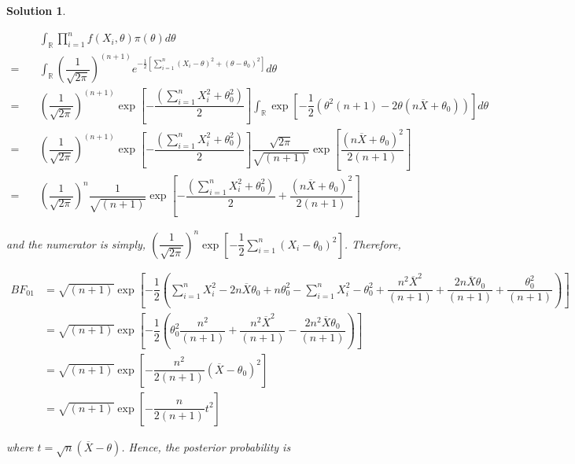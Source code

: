 \documentclass[12pt]{article}
\theoremstyle{problemstyle}
\newtheorem*{solution*}{Solution}
\newcommand{\R}{\mathbb{R}}
\begin{document}
\begin{solution*}
\begin{enumerate}
        \begingroup
        \allowdisplaybreaks
        \begin{align*}
            & \int_{\R} \prod_{i = 1}^n f(X_i, \theta) \pi(\theta) d\theta \\
            = \quad & \int_{\R} \left( \dfrac{1}{\sqrt{2\pi}} \right)^{(n+1)} e^{-\frac{1}{2}\left[ \sum_{i=1}^n (X_i - \theta)^2 + (\theta - \theta_0)^2 \right]} d\theta\\
            = \quad & \left( \dfrac{1}{\sqrt{2\pi}} \right)^{(n+1)} \exp\left[ -\dfrac{\left(\sum_{i=1}^n X_i^2 + \theta_0^2\right)}{2} \right] \int_{\R} \exp\left[ -\dfrac{1}{2}\left(  \theta^2 (n+1) - 2\theta(n\overline{X} + \theta_0) \right) \right]d\theta\\
            = \quad & \left( \dfrac{1}{\sqrt{2\pi}} \right)^{(n+1)} \exp\left[ -\dfrac{\left(\sum_{i=1}^n X_i^2 + \theta_0^2\right)}{2} \right] \dfrac{\sqrt{2\pi}}{\sqrt{(n+1)}} \exp\left[ \dfrac{(n\overline{X} + \theta_0)^2}{2(n+1)} \right]\\
            = \quad & \left( \dfrac{1}{\sqrt{2\pi}} \right)^{n} \dfrac{1}{\sqrt{(n+1)}} \exp\left[ -\dfrac{\left(\sum_{i=1}^n X_i^2 + \theta_0^2\right)}{2} + \dfrac{(n\overline{X} + \theta_0)^2}{2(n+1)} \right]
        \end{align*}
        \endgroup

        and the numerator is simply, $\left( \dfrac{1}{\sqrt{2\pi}} \right)^{n} \exp\left[ -\dfrac{1}{2}\sum_{i=1}^n (X_i - \theta_0)^2 \right]$. Therefore, 

        \begin{align*}
            BF_{01}
            & = \sqrt{(n+1)} \exp\left[ -\dfrac{1}{2}\left( \sum_{i=1}^n X_i^2 - 2n\overline{X}\theta_0 + n\theta_0^2 - \sum_{i=1}^n X_i^2 - \theta_0^2 + \dfrac{n^2\overline{X}^2}{(n+1)} + \dfrac{2n\overline{X}\theta_0}{(n+1)} + \dfrac{\theta_0^2}{(n+1)} \right) \right]\\
            & = \sqrt{(n+1)} \exp\left[ -\dfrac{1}{2} \left( \theta_0^2 \dfrac{n^2}{(n+1)} + \dfrac{n^2 \overline{X}^2}{(n+1)} - \dfrac{2n^2 \overline{X}\theta_0}{(n+1)} \right) \right]\\
            & = \sqrt{(n+1)} \exp\left[ - \dfrac{n^2}{2(n+1)} (\overline{X} - \theta_0)^2 \right]\\
            & = \sqrt{(n+1)}\exp\left[ - \dfrac{n}{2(n+1)} t^2 \right]
        \end{align*}

        where $t = \sqrt{n}(\overline{X} - \theta)$. Hence, the posterior probability is 


\end{enumerate}
\end{solution*}
\end{document}
